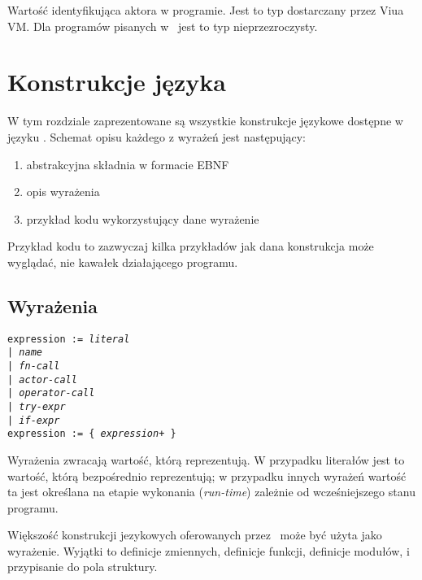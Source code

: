 Wartość identyfikująca aktora w programie.
Jest to typ dostarczany przez Viua VM. Dla programów pisanych w \ViuAct\ jest to
typ nieprzezroczysty.

\section{Konstrukcje języka}

W tym rozdziale zaprezentowane są wszystkie konstrukcje językowe dostępne w języku \ViuAct.
Schemat opisu każdego z wyrażeń jest następujący:

\begin{enumerate}
    \item abstrakcyjna składnia w formacie EBNF
    \item opis wyrażenia
    \item przykład kodu wykorzystujący dane wyrażenie
\end{enumerate}

Przykład kodu to zazwyczaj kilka przykładów jak dana konstrukcja może wyglądać, nie kawałek działającego
programu.

\subsection{Wyrażenia}
\label{language_expressions}

\texttt{expression := \emph{literal} \\
\phantom{expression :}| \emph{name} \\
\phantom{expression :}| \emph{fn-call} \\
\phantom{expression :}| \emph{actor-call} \\
\phantom{expression :}| \emph{operator-call} \\
\phantom{expression :}| \emph{try-expr} \\
\phantom{expression :}| \emph{if-expr}}
\\
\texttt{expression := \{ \emph{expression}+ \}}
\vspace{1em}

Wyrażenia zwracają wartość, którą reprezentują. W przypadku literałów jest to wartość, którą bezpośrednio
reprezentują; w przypadku innych wyrażeń wartość ta jest określana na etapie wykonania (\emph{run-time})
zależnie od wcześniejszego stanu programu.

Większość konstrukcji jezykowych oferowanych przez \ViuAct\ może być użyta jako wyrażenie.
Wyjątki to definicje zmiennych, definicje funkcji, definicje modułów, i przypisanie do pola struktury.

